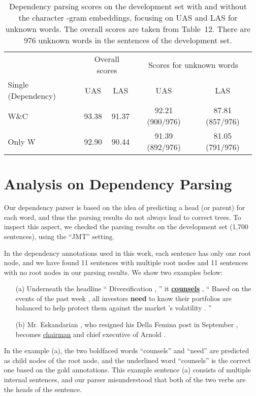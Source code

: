 \documentclass[11pt,a4paper]{article}
\begin{document}
\begin{table*}[t]
  \begin{center}
\begin{tabular}{l|cc|cc}
                        & \multicolumn{2}{|c|}{Overall scores} & \multicolumn{2}{|c}{Scores for unknown words} \\
  	Single (Dependency) & UAS   & LAS   & UAS             & LAS \\ \hline
    W\&C                & 93.38 & 91.37 & 92.21 (900/976) & 87.81 (857/976) \\ \hline
    Only W              & 92.90 & 90.44 & 91.39 (892/976) & 81.05 (791/976) \\ \hline
  \end{tabular}
\caption{Dependency parsing scores on the development set with and without the character -gram embeddings, focusing on UAS and LAS for unknown words.
    	     The overall scores are taken from Table~12.
             There are 976 unknown words in the sentences of the development set.}
    \label{tb:dep_unk}
  \end{center}
\end{table*}


\section{Analysis on Dependency Parsing}
\label{sec:dep_analysis}

Our dependency parser is based on the idea of predicting a head (or parent) for each word, and thus the parsing results do not always lead to correct trees.
To inspect this aspect, we checked the parsing results on the development set (1,700 sentences), using the ``JMT'' setting.

In the dependency annotations used in this work, each sentence has only one root node, and we have found 11 sentences with multiple root nodes and 11 sentences with no root nodes in our parsing results.
We show two examples below:
\begin{itemize}
\item[(a)] Underneath the headline `` Diversification , '' it \underline{{\bf counsels}} , `` Based on the events of the past week , all investors {\bf need} to know their portfolios are balanced to help protect them against the market 's volatility . ''
\item[(b)] Mr. Eskandarian , who resigned his Della Femina post in September , becomes \underline{chairman} and chief executive of Arnold .
\end{itemize}
In the example (a), the two boldfaced words ``counsels'' and ``need'' are predicted as child nodes of the root node, and the underlined word ``counsels'' is the correct one based on the gold annotations.
This example sentence (a) consists of multiple internal sentences, and our parser misunderstood that both of the two verbs are the heads of the sentence.
\end{document}
